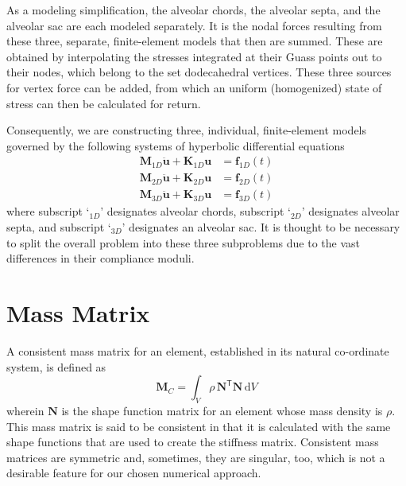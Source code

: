 As a modeling simplification, the alveolar chords, the alveolar septa, and the alveolar sac are each modeled separately.  It is the nodal forces resulting from these three, separate, finite-element models that then are summed.  These are obtained by interpolating the stresses integrated at their Guass points out to their nodes, which belong to the set dodecahedral vertices.  These three sources for vertex force can be added, from which an uniform (homogenized) state of stress can then be calculated for return.  

Consequently, we are constructing three, individual, finite-element models governed by the following systems of hyperbolic differential equations
\begin{subequations}
    \begin{align}
    \mathbf{M}_{1D} \ddot{\mathbf{u}} + \mathbf{K}_{1D} \mathbf{u} & 
    = \mathbf{f}_{1D}(t) \\
    \mathbf{M}_{2D} \ddot{\mathbf{u}} + \mathbf{K}_{2D} \mathbf{u} & 
    = \mathbf{f}_{2D}(t) \\
    \mathbf{M}_{3D} \ddot{\mathbf{u}} + \mathbf{K}_{3D} \mathbf{u} & 
    = \mathbf{f}_{3D}(t)
    \end{align}
\end{subequations}
where subscript `$\mbox{}_{1D}$' designates alveolar chords, subscript `$\mbox{}_{2D}$' designates alveolar septa, and subscript `$\mbox{}_{3D}$' designates an alveolar sac.  It is thought to be necessary to split the overall problem into these three subproblems due to the vast differences in their compliance moduli.

\section{Mass Matrix}

A consistent mass matrix \cite{Archer65} for an element, established in its natural co-ordinate system, is defined as
\begin{equation}
	\mathbf{M}_{C} = \int_{V} \rho \, \mathbf{N}^{\mathsf{T}} \mathbf{N} \,
	\mathrm{d} V
	\label{consistentMassMatrix}
\end{equation}
wherein $\mathbf{N}$ is the shape function matrix for an element whose mass density is $\rho$.  This mass matrix is said to be consistent in that it is calculated with the same shape functions that are used to create the stiffness matrix.  Consistent mass matrices are symmetric and, sometimes, they are singular, too, which is not a desirable feature for our chosen numerical approach.

